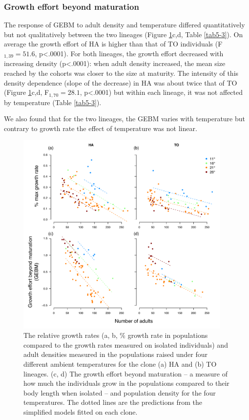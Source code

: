 \subsubsection{Growth effort beyond maturation}

The response of GEBM to adult density and temperature differed quantitatively
but not qualitatively between the two lineages (Figure \ref{Fig5-4}c,d, Table
\ref{tab5-3}).
On average the growth effort of HA is higher than that of TO individuals
(F$_{1,39}=51.6$, p<.0001). For both lineages, the growth effort decreased with
increasing density (p<.0001): when adult density increased, the mean size reached by the cohorts
was closer to the size at maturity. The intensity of this density dependence
(slope of the decrease) in HA was about twice that of TO (Figure
\ref{Fig5-4}c,d, F$_{1,70}=28.1$, p<.0001) but within each lineage, it was not
affected by temperature (Table \ref{tab5-3}).

We also found that for the two lineages, the GEBM varies with temperature but
contrary to growth rate the effect of temperature was not linear.

\begin{figure}[!ht] %
\centering
\includegraphics[width=0.95\textwidth]{5_ChapExp3/fig/Fig4} 
\caption[Relative growth rates and adult
densities in populations]{ The relative growth rates (a, b, \% growth rate in
populations compared to the growth rates measured on isolated individuals) and adult densities measured in the populations raised under four different ambient temperatures for the clone
(a) HA and (b) TO lineages. (c, d) The growth effort beyond maturation -- a
measure of how much the individuals grow in the populations compared to their
body length when isolated -- and population density for the four temperatures.
The dotted lines are the predictions from the simplified models fitted on each
clone.
}
\label{Fig5-4}
\end{figure}

